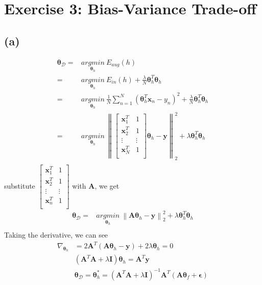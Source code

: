 \documentclass[11pt]{article}
\begin{document}
\pagebreak
\section*{Exercise 3: Bias-Variance Trade-off}
\subsection*{(a)}
\begin{equation}
\begin{split}
\pmb{\theta}_\mathcal{D}=&\underset{\pmb{\theta}_h}{argmin}\ E_{aug}(h)\\
=&\underset{\pmb{\theta}_h}{argmin}\ E_{in}(h)+\frac{\lambda}{N}\pmb{\theta}^T_h\pmb{\theta}_h\\
=&\underset{\pmb{\theta}_h}{argmin}\ \frac{1}{N}\sum_{n=1}^{N}(\pmb{\theta}_h^T\pmb{x}_n-y_n)^2	+\frac{\lambda}{N}\pmb{\theta}^T_h\pmb{\theta}_h\\
=&\underset{\pmb{\theta}_h}{argmin}\ 
\left\lVert\begin{bmatrix}
\pmb{x}_1^T & 1\\
\pmb{x}_2^T & 1\\
\vdots & \vdots\\
\pmb{x}_N^T & 1\\
\end{bmatrix}
\pmb{\theta}_h - \pmb{y}\right\rVert^2_2
+\lambda\pmb{\theta}^T_h\pmb{\theta}_h\\
\end{split}
\end{equation}
substitute $\begin{bmatrix}
\pmb{x}_1^T & 1\\
\pmb{x}_2^T & 1\\
\vdots & \vdots\\
\pmb{x}_n^T & 1\\
\end{bmatrix}$
with $\pmb{A}$, we get
\begin{equation}
\begin{split}
\pmb{\theta}_\mathcal{D}=&\underset{\pmb{\theta}_h}{argmin}\ \left\lVert\pmb{A}\pmb{\theta}_h - \pmb{y}\right\rVert^2_2
+\lambda\pmb{\theta}^T_h\pmb{\theta}_h\\
\end{split}
\end{equation}
Taking the derivative, we can see
\begin{equation}
\begin{split}
\nabla_{\pmb{\theta}_h} &= 2\pmb{A}^T(\pmb{A\theta}_h-\pmb{y})+2\lambda\pmb{\theta}_h = 0\\
&(\pmb{A}^T\pmb{A}+\lambda\pmb{I})\pmb{\theta}_h = \pmb{A}^T\pmb{y}\\
&\pmb{\theta}_{\mathcal{D}}=\pmb{\theta}_h^* = (\pmb{A}^T\pmb{A}+\lambda\pmb{I})^{-1}\pmb{A}^T(\pmb{A}\pmb{\theta}_f+\pmb{\epsilon})
\end{split}
\end{equation}
\end{document}
